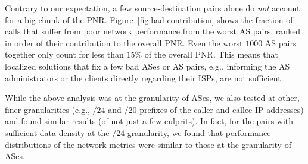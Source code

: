 Contrary to our expectation, a few source-destination pairs 
alone do {\em not} account for a big chunk of the PNR. %
 Figure~\ref{fig:bad-contribution} shows the fraction of 
 calls that suffer from poor network performance from the 
 worst AS pairs, ranked in order of their contribution to the 
 overall PNR. %
Even the worst $1000$ AS pairs together only count for less 
than $15\%$ of the overall PNR. %
This means that localized solutions that fix a few bad ASes 
or AS pairs, e.g., informing the AS administrators or the 
clients directly regarding their ISPs, are not sufficient. 
 
 
While the above analysis was at the granularity of ASes, 
we also tested at other, finer granularities (e.g., $/24$ and 
$/20$ prefixes of the caller and callee IP addresses) and 
found similar results (of not just a few culprits).
In fact, for the pairs with sufficient data density at the $/24$ 
granularity, we found that performance distributions of the 
network metrics were similar to those at the granularity of ASes.%



